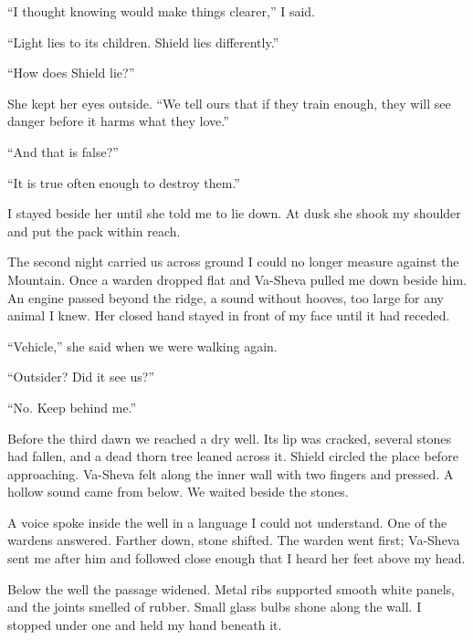 ``I thought knowing would make things clearer,'' I said.\par

``Light lies to its children. Shield lies differently.''\par

``How does Shield lie?''\par

She kept her eyes outside. ``We tell ours that if they train enough, they will see danger before it harms what they love.''\par

``And that is false?''\par

``It is true often enough to destroy them.''\par

I stayed beside her until she told me to lie down. At dusk she shook my shoulder and put the pack within reach.\par

The second night carried us across ground I could no longer measure against the Mountain. Once a warden dropped flat and Va-Sheva pulled me down beside him. An engine passed beyond the ridge, a sound without hooves, too large for any animal I knew. Her closed hand stayed in front of my face until it had receded.\par

``Vehicle,'' she said when we were walking again.\par

``Outsider? Did it see us?''\par

``No. Keep behind me.''\par

Before the third dawn we reached a dry well. Its lip was cracked, several stones had fallen, and a dead thorn tree leaned across it. Shield circled the place before approaching. Va-Sheva felt along the inner wall with two fingers and pressed. A hollow sound came from below. We waited beside the stones.\par

A voice spoke inside the well in a language I could not understand. One of the wardens answered. Farther down, stone shifted. The warden went first; Va-Sheva sent me after him and followed close enough that I heard her feet above my head.\par

Below the well the passage widened. Metal ribs supported smooth white panels, and the joints smelled of rubber. Small glass bulbs shone along the wall. I stopped under one and held my hand beneath it.\par

